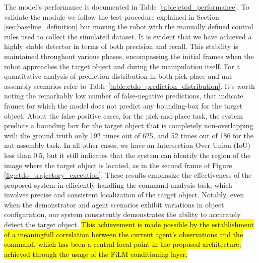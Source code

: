 The model's performance is documented in Table \ref{table:ctod_performance}. To validate the module we follow the test procedure explained in Section \ref{sec:baseline_definition} but moving the robot with the manually defined control rules used to collect the simulated dataset. It is evident that we have achieved a highly stable detector in terms of both precision and recall. This stability is maintained throughout various phases, encompassing the initial frames when the robot approaches the target object and during the manipulation itself. For a quantitative analysis of prediction distribution in both pick-place and nut-assembly scenarios refer to Table \ref{table:ctdo_prediction_distribution}. It's worth noting the remarkably low number of false-negative predictions, that indicate frames for which the model does not predict any bounding-box for the target object. About the false positive cases, for the pick-and-place task, the system predicts a bounding box for the target object that is completely non-overlapping with the ground truth only 192 times out of 625, and 52 times out of 186 for the nut-assembly task. In all other cases, we have an Intersection Over Union (IoU) less than 0.5, but it still indicates that the system can identify the region of the image where the target object is located, as in the second frame of Figure \ref{fig:ctdo_trajectory_execution}. These results emphasize the effectiveness of the proposed system in efficiently handling the command analysis task, which involves precise and consistent localization of the target object. Notably, even when the demonstrator and agent scenarios exhibit variations in object configuration, our system consistently demonstrates the ability to accurately detect the target object. \hl{This achievement is made possible by the establishment of a meaningfull correlation between the current agent's observations and the command, which has been a central focal point in the proposed architecture, achieved through the usage of the FiLM conditioning layer.}


